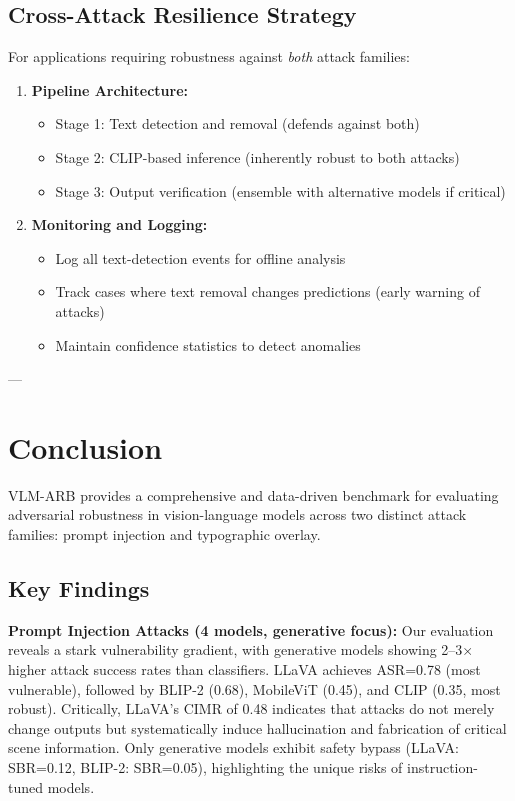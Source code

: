 \documentclass[11pt]{article}
\begin{document}
\subsection{Cross-Attack Resilience Strategy}

For applications requiring robustness against \textit{both} attack families:

\begin{enumerate}[leftmargin=2em]
    \item \textbf{Pipeline Architecture:}
    \begin{itemize}[leftmargin=1.5em]
        \item Stage 1: Text detection and removal (defends against both)
        \item Stage 2: CLIP-based inference (inherently robust to both attacks)
        \item Stage 3: Output verification (ensemble with alternative models if critical)
    \end{itemize}
    
    \item \textbf{Monitoring and Logging:}
    \begin{itemize}[leftmargin=1.5em]
        \item Log all text-detection events for offline analysis
        \item Track cases where text removal changes predictions (early warning of attacks)
        \item Maintain confidence statistics to detect anomalies
    \end{itemize}
\end{enumerate}

---

\section{Conclusion}

VLM-ARB provides a comprehensive and data-driven benchmark for evaluating adversarial robustness in vision-language models across two distinct attack families: prompt injection and typographic overlay.

\subsection{Key Findings}

\textbf{Prompt Injection Attacks (4 models, generative focus):}
Our evaluation reveals a stark vulnerability gradient, with generative models showing 2--3× higher attack success rates than classifiers. LLaVA achieves ASR=0.78 (most vulnerable), followed by BLIP-2 (0.68), MobileViT (0.45), and CLIP (0.35, most robust). Critically, LLaVA's CIMR of 0.48 indicates that attacks do not merely change outputs but systematically induce hallucination and fabrication of critical scene information. Only generative models exhibit safety bypass (LLaVA: SBR=0.12, BLIP-2: SBR=0.05), highlighting the unique risks of instruction-tuned models.
\end{document}
